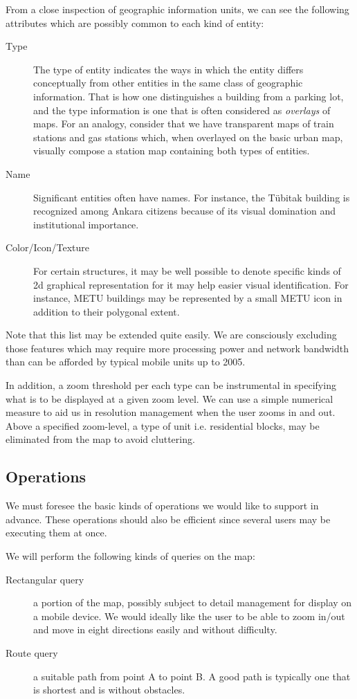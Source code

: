 \documentclass[a4paper,10pt]{article}
\begin{document}
From a close inspection of geographic information units, we can see the
following attributes which are possibly common to each kind of entity:
\begin{description}
\item[Type] The type of entity indicates the ways in which the entity
  differs conceptually from other entities in the same class of geographic
  information. That is how one distinguishes a building from a parking lot,
  and the type information is one that is often considered as
  \emph{overlays} of maps. For an analogy, consider that we have transparent
  maps of train stations and gas stations which, when overlayed on the basic
  urban map, visually compose a station map containing both types of
  entities.
\item[Name] Significant entities often have names. For instance, the T\"ubitak
  building is recognized among Ankara citizens because of its visual
  domination and institutional importance.
\item[Color/Icon/Texture] For certain structures, it may be well possible to
  denote specific kinds of 2d graphical representation for it may help
  easier visual identification. For instance, METU buildings may be
  represented by a small METU icon in addition to their polygonal extent.
\end{description}  

Note that this list may be extended quite easily. We are consciously
excluding those features which may require more processing power and network
bandwidth than can be afforded by typical mobile units up to 2005.

In addition, a zoom threshold per each type can be instrumental in
specifying what is to be displayed at a given zoom level. We can use a
simple numerical measure to aid us in resolution management when the user
zooms in and out. Above a specified zoom-level, a type of unit i.e.
residential blocks, may be eliminated from the map to avoid cluttering.

\subsection{Operations}

We must foresee the basic kinds of operations we would like to support in
advance.  These operations should also be efficient since several users may
be executing them at once.

We will perform the following kinds of queries on the map:
\begin{description}
\item[Rectangular query] a portion of the map, possibly subject to detail
  management for display on a mobile device. We would ideally like the user
  to be able to zoom in/out and move in eight directions easily and without
  difficulty.
\item[Route query] a suitable path from point A to point B. A good path is
  typically one that is shortest and is without obstacles.
\end{description}
\end{document}

